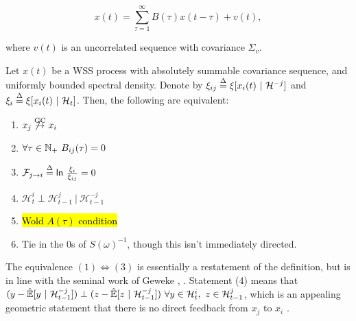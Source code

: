 \documentclass[12pt]{article}
\def\gc{\overset{\text{GC}}{\rightarrow}}  %
\newcommand{\linE}[2]{\hat{\E}[#1\ |\ #2]}  %
\newcommand{\linEerr}[2]{\xi[#1\ |\ #2]}  %
\begin{document}
\begin{equation}
  \label{eqn:ar_representation}
  x(t) = \sum_{\tau = 1}^\infty B(\tau) x(t - \tau) + v(t),
\end{equation}

where $v(t)$ is an uncorrelated sequence with covariance $\Sigma_v$.

\begin{theorem}
  Let $x(t)$ be a WSS process with absolutely summable covariance
  sequence, and uniformly bounded spectral density.  Denote by
  $\xi_{ij} \defeq \linEerr{x_i(t)}{\mathcal{H}^{-j}}$ and
  $\xi_i \defeq \linEerr{x_i(t)}{\mathcal{H}_t}$.  Then, the following are equivalent:

  \begin{enumerate}
    \item{$x_j \not\gc x_i$}
    \item{$\forall \tau \in \N_+\ B_{ij}(\tau) = 0$}
    \item{$\mathcal{F}_{j \rightarrow i} \overset{\Delta}{=} \mathsf{ln\ }\frac{\xi_i}{\xi_{ij}} = 0$}
    \item{$\mathcal{H}_t^{i} \perp \mathcal{H}_{t - 1}^{j}\ |\ \mathcal{H}_{t - 1}^{-j}$}
    \item{\hl{Wold $A(\tau)$ condition}}
    \item{Tie in the 0s of $S(\omega)^{-1}$, though this isn't immediately directed.}
  \end{enumerate}
\end{theorem}

The equivalence $(1) \iff (3)$ is essentially a restatement of the
definition, but is in line with the seminal work of Geweke
\cite{geweke1982}, \cite{geweke1984}.  Statement (4) means that
$(y - \linE{y}{\mathcal{H}_{t - 1}^{-j}}) \perp (z -
\linE{z}{\mathcal{H}_{t - 1}^{-j}})\ \forall y \in \mathcal{H}_t^i,\ z \in
\mathcal{H}_{t - 1}^j$, which is an appealing geometric statement that
there is no direct feedback from $x_j$ to $x_i$ \cite{lindquist}.
\end{document}
